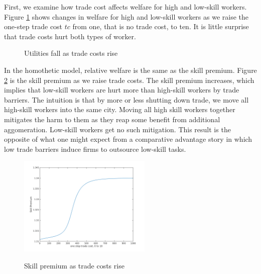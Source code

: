 \documentclass{article}
\begin{document}
    First, we examine how trade cost affects welfare for high and low-skill workers.  Figure \ref{fig:tc_both_hurt} shows changes in welfare for high and low-skill workers as we raise the one-step trade cost $tc$ from one, that is no trade cost, to ten.  It is little surprise that trade costs hurt both types of worker.  
    \begin{figure}[!ht]
      \centering
      \caption{Utilities fall as trade costs rise}
      \label{fig:tc_both_hurt}
    \end{figure}

    In the homothetic model, relative welfare is the same as the skill premium.  Figure \ref{tc_skill_prem} is the skill premium as we raise trade costs. The skill premium increases, which implies that low-skill workers are hurt more than high-skill workers by trade barriers.  The intuition is that by more or less shutting down trade, we move all high-skill workers into the same city.  Moving all high skill workers together mitigates the harm to them as they reap some benefit from additional aggomeration.  Low-skill workers get no such mitigation.  This result is the opposite of what one might expect from a comparative advantage story in which low trade barriers induce firms to outsource low-skill tasks.

    \begin{figure}[!ht]
      \centering
      {\includegraphics[width=2.5in]{pics/tc/skill_prem.png}}
      \caption{Skill premium as trade costs rise}
      \label{tc_skill_prem}
    \end{figure}
\end{document}
